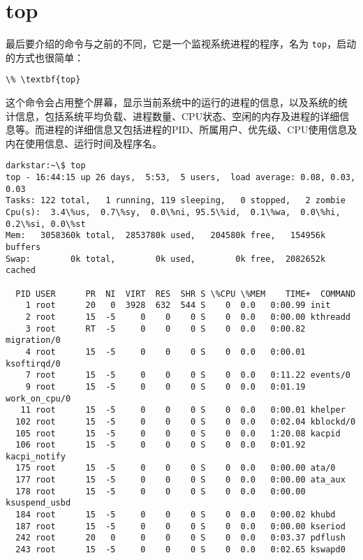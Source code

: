 \section{top}
\label{sec:processControl:top}
最后要介绍的命令与之前的不同，它是一个监视系统进程的程序，名为
\texttt{top}，启动的方式也很简单：
\begin{Verbatim}[frame=single, commandchars=\\\{\}]
\% \textbf{top}
\end{Verbatim}
这个命令会占用整个屏幕，显示当前系统中的运行的进程的信息，以及系统的统
计信息，包括系统平均负载、进程数量、CPU状态、空闲的内存及进程的详细信
息等。而进程的详细信息又包括进程的PID、所属用户、优先级、CPU使用信息及
内在使用信息、运行时间及程序名。
\begin{Verbatim}[frame=single, commandchars=\\\{\}]
darkstar:~\$ top
top - 16:44:15 up 26 days,  5:53,  5 users,  load average: 0.08, 0.03, 0.03
Tasks: 122 total,   1 running, 119 sleeping,   0 stopped,   2 zombie
Cpu(s):  3.4\%us,  0.7\%sy,  0.0\%ni, 95.5\%id,  0.1\%wa,  0.0\%hi,  0.2\%si, 0.0\%st
Mem:   3058360k total,  2853780k used,   204580k free,   154956k buffers
Swap:        0k total,        0k used,        0k free,  2082652k cached

  PID USER      PR  NI  VIRT  RES  SHR S \%CPU \%MEM    TIME+  COMMAND            
    1 root      20   0  3928  632  544 S    0  0.0   0:00.99 init               
    2 root      15  -5     0    0    0 S    0  0.0   0:00.00 kthreadd           
    3 root      RT  -5     0    0    0 S    0  0.0   0:00.82 migration/0        
    4 root      15  -5     0    0    0 S    0  0.0   0:00.01 ksoftirqd/0        
    7 root      15  -5     0    0    0 S    0  0.0   0:11.22 events/0           
    9 root      15  -5     0    0    0 S    0  0.0   0:01.19 work_on_cpu/0      
   11 root      15  -5     0    0    0 S    0  0.0   0:00.01 khelper            
  102 root      15  -5     0    0    0 S    0  0.0   0:02.04 kblockd/0          
  105 root      15  -5     0    0    0 S    0  0.0   1:20.08 kacpid             
  106 root      15  -5     0    0    0 S    0  0.0   0:01.92 kacpi_notify       
  175 root      15  -5     0    0    0 S    0  0.0   0:00.00 ata/0              
  177 root      15  -5     0    0    0 S    0  0.0   0:00.00 ata_aux            
  178 root      15  -5     0    0    0 S    0  0.0   0:00.00 ksuspend_usbd      
  184 root      15  -5     0    0    0 S    0  0.0   0:00.02 khubd              
  187 root      15  -5     0    0    0 S    0  0.0   0:00.00 kseriod            
  242 root      20   0     0    0    0 S    0  0.0   0:03.37 pdflush            
  243 root      15  -5     0    0    0 S    0  0.0   0:02.65 kswapd0
\end{Verbatim}

